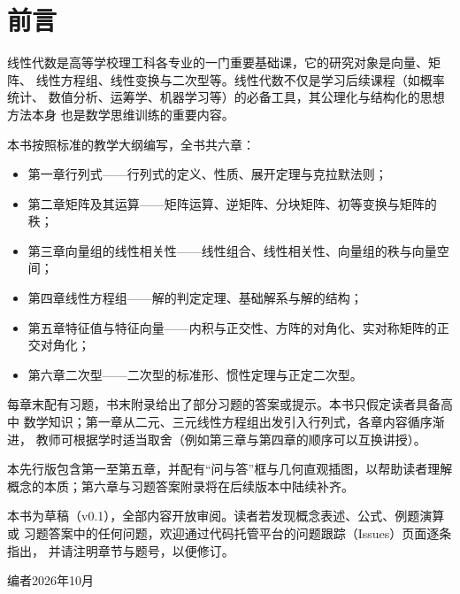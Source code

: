 \chapter*{前言}

线性代数是高等学校理工科各专业的一门重要基础课，它的研究对象是向量、矩阵、
线性方程组、线性变换与二次型等。线性代数不仅是学习后续课程（如概率统计、
数值分析、运筹学、机器学习等）的必备工具，其公理化与结构化的思想方法本身
也是数学思维训练的重要内容。

本书按照标准的教学大纲编写，全书共六章：

\begin{itemize}[itemsep=1pt]
  \item 第一章\quad 行列式——行列式的定义、性质、展开定理与克拉默法则；
  \item 第二章\quad 矩阵及其运算——矩阵运算、逆矩阵、分块矩阵、初等变换与矩阵的秩；
  \item 第三章\quad 向量组的线性相关性——线性组合、线性相关性、向量组的秩与向量空间；
  \item 第四章\quad 线性方程组——解的判定定理、基础解系与解的结构；
  \item 第五章\quad 特征值与特征向量——内积与正交性、方阵的对角化、实对称矩阵的正交对角化；
  \item 第六章\quad 二次型——二次型的标准形、惯性定理与正定二次型。
\end{itemize}

每章末配有习题，书末附录给出了部分习题的答案或提示。本书只假定读者具备高中
数学知识；第一章从二元、三元线性方程组出发引入行列式，各章内容循序渐进，
教师可根据学时适当取舍（例如第三章与第四章的顺序可以互换讲授）。

本先行版包含第一至第五章，并配有“问与答”框与几何直观插图，以帮助读者理解
概念的本质；第六章与习题答案附录将在后续版本中陆续补齐。

本书为草稿（v0.1），全部内容开放审阅。读者若发现概念表述、公式、例题演算或
习题答案中的任何问题，欢迎通过代码托管平台的问题跟踪（Issues）页面逐条指出，
并请注明章节与题号，以便修订。

\begin{flushright}
编者\quad 2026年10月
\end{flushright}

